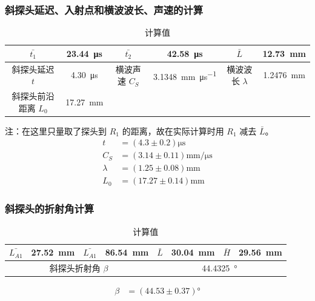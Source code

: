 \documentclass[a4paper,utf8]{article}
\begin{document}
        \subsubsection{斜探头延迟、入射点和横波波长、声速的计算}
            \begin{table}[!ht]\caption{计算值}
                \centering\begin{tabular}{c c|c c|c c}\hline
                    $\bar{t_1}$ & \SI{23.44}{\us} & $\bar{t_2}$ & \SI{42.58}{\us}& $\bar{L}$ & \SI{12.73}{\mm} \\ \hline
                    斜探头延迟 $t$ & \SI{4.30}{\us} & 横波声速 $C_S$ & \SI{3.1348}{\mm\per\us}& 横波波长 $\lambda$ & \SI{1.2476}{\mm} \\ \hline
                     斜探头前沿距离 $L_0$ & \SI{17.27}{\mm} & & & & \\ \hline
                \end{tabular}
            \end{table}\par
            注：在这里只量取了探头到 $R_1$ 的距离，故在实际计算时用 $R_1$ 减去 $\bar{L}$。
            \begin{align*}
                t &= (4.3 \pm 0.2) \unit{\us}\\
                C_S &= (3.14 \pm 0.11) \unit{\mm\per\us}\\
                \lambda &= (1.25 \pm 0.08) \unit{\mm}\\
                L_0 &= (17.27 \pm 0.14) \unit{\mm}
            \end{align*}
        \subsubsection{斜探头的折射角计算}
            \begin{table}[!ht]\caption{计算值}
                \centering\begin{tabular}{c c|c c|c c|c c}\hline
                    $\bar{L_{A1}}$ & \SI{27.52}{\mm} & $\bar{L_{A1}}$ & \SI{86.54}{\mm}& $\bar{L}$ & \SI{30.04}{\mm} & $\bar{H}$ & \SI{29.56}{\mm}\\ \hline
                    \multicolumn{4}{c}{斜探头折射角 $\beta$} & \multicolumn{4}{c}{\SI{44.4325}{\degree}} \\ \hline  
                \end{tabular}
            \end{table}\par
            \begin{align*}
                \beta &= (44.53 \pm 0.37) \unit{\degree}
            \end{align*}
\end{document}
